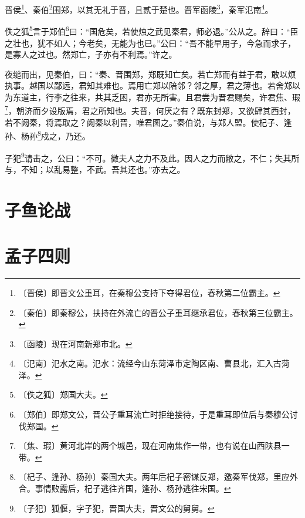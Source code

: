 \documentclass[12pt,UTF-8,openany]{ctexbook}
\begin{document}
\begin{normalsize}
    
    晋侯\footnote{〔晋侯〕即晋文公重耳，在秦穆公支持下夺得君位，春秋第二位霸主。}、秦伯\footnote{〔秦伯〕即秦穆公，扶持在外流亡的晋公子重耳继承君位，春秋第三位霸主。}围郑，以其无礼于晋，且贰于楚也。晋军函陵\footnote{〔函陵〕现在河南新郑市北。}，秦军氾南\footnote{〔氾南〕氾水之南。氾水：流经今山东菏泽市定陶区南、曹县北，汇入古菏泽。}。
    
    佚之狐\footnote{〔佚之狐〕郑国大夫。}言于郑伯\footnote{〔郑伯〕即郑文公，晋公子重耳流亡时拒绝接待，于是重耳即位后与秦穆公讨伐郑国。}曰：“国危矣，若使烛之武见秦君，师必退。”公从之。辞曰：“臣之壮也，犹不如人；今老矣，无能为也已。”公曰：“吾不能早用子，今急而求子，是寡人之过也。然郑亡，子亦有不利焉。”许之。
    
    夜缒而出，见秦伯，曰：“秦、晋围郑，郑既知亡矣。若亡郑而有益于君，敢以烦执事。越国以鄙远，君知其难也。焉用亡郑以陪邻？邻之厚，君之薄也。若舍郑以为东道主，行李之往来，共其乏困，君亦无所害。且君尝为晋君赐矣，许君焦、瑕\footnote{〔焦、瑕〕黄河北岸的两个城邑，现在河南焦作一带，也有说在山西陕县一带。}，朝济而夕设版焉，君之所知也。夫晋，何厌之有？既东封郑，又欲肆其西封，若不阙秦，将焉取之？阙秦以利晋，唯君图之。”秦伯说，与郑人盟。使杞子、逢孙、杨孙\footnote{〔杞子、逢孙、杨孙〕秦国大夫。两年后杞子密谋反郑，邀秦军伐郑，里应外合。事情败露后，杞子逃往齐国，逢孙、杨孙逃往宋国。}戍之，乃还。
    
    子犯\footnote{〔子犯〕狐偃，字子犯，晋国大夫，晋文公的舅舅。}请击之，公曰：“不可。微夫人之力不及此。因人之力而敝之，不仁；失其所与，不知；以乱易整，不武。吾其还也。”亦去之。
\end{normalsize}



\chapter{子鱼论战}

\begin{normalsize}
    
    
\end{normalsize}



\chapter{孟子四则}
\end{document}
